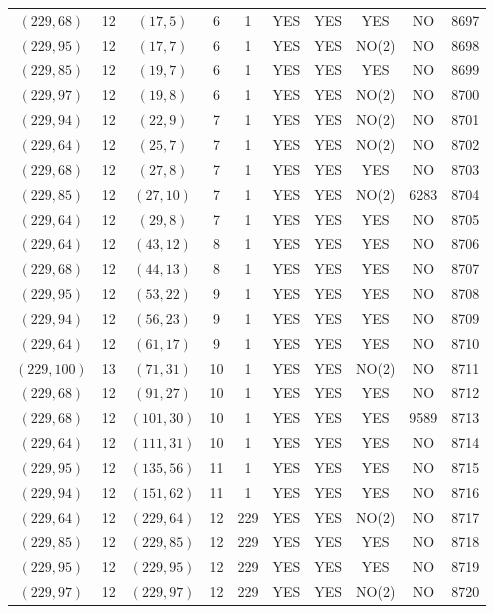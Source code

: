 \begin{longtable}{|c|c|c|c|c|c|c|c|c|c|}
$(229, 68)$ & 12 & $(17, 5)$ & 6 & 1 & YES & YES & YES & NO & 8697\\
$(229, 95)$ & 12 & $(17, 7)$ & 6 & 1 & YES & YES & NO(2) & NO & 8698\\
$(229, 85)$ & 12 & $(19, 7)$ & 6 & 1 & YES & YES & YES & NO & 8699\\
$(229, 97)$ & 12 & $(19, 8)$ & 6 & 1 & YES & YES & NO(2) & NO & 8700\\
$(229, 94)$ & 12 & $(22, 9)$ & 7 & 1 & YES & YES & NO(2) & NO & 8701\\
$(229, 64)$ & 12 & $(25, 7)$ & 7 & 1 & YES & YES & NO(2) & NO & 8702\\
$(229, 68)$ & 12 & $(27, 8)$ & 7 & 1 & YES & YES & YES & NO & 8703\\
$(229, 85)$ & 12 & $(27, 10)$ & 7 & 1 & YES & YES & NO(2) & 6283 & 8704\\
$(229, 64)$ & 12 & $(29, 8)$ & 7 & 1 & YES & YES & YES & NO & 8705\\
$(229, 64)$ & 12 & $(43, 12)$ & 8 & 1 & YES & YES & YES & NO & 8706\\
$(229, 68)$ & 12 & $(44, 13)$ & 8 & 1 & YES & YES & YES & NO & 8707\\
$(229, 95)$ & 12 & $(53, 22)$ & 9 & 1 & YES & YES & YES & NO & 8708\\
$(229, 94)$ & 12 & $(56, 23)$ & 9 & 1 & YES & YES & YES & NO & 8709\\
$(229, 64)$ & 12 & $(61, 17)$ & 9 & 1 & YES & YES & YES & NO & 8710\\
$(229, 100)$ & 13 & $(71, 31)$ & 10 & 1 & YES & YES & NO(2) & NO & 8711\\
$(229, 68)$ & 12 & $(91, 27)$ & 10 & 1 & YES & YES & YES & NO & 8712\\
$(229, 68)$ & 12 & $(101, 30)$ & 10 & 1 & YES & YES & YES & 9589 & 8713\\
$(229, 64)$ & 12 & $(111, 31)$ & 10 & 1 & YES & YES & YES & NO & 8714\\
$(229, 95)$ & 12 & $(135, 56)$ & 11 & 1 & YES & YES & YES & NO & 8715\\
$(229, 94)$ & 12 & $(151, 62)$ & 11 & 1 & YES & YES & YES & NO & 8716\\
$(229, 64)$ & 12 & $(229, 64)$ & 12 & 229 & YES & YES & NO(2) & NO & 8717\\
$(229, 85)$ & 12 & $(229, 85)$ & 12 & 229 & YES & YES & YES & NO & 8718\\
$(229, 95)$ & 12 & $(229, 95)$ & 12 & 229 & YES & YES & YES & NO & 8719\\
$(229, 97)$ & 12 & $(229, 97)$ & 12 & 229 & YES & YES & NO(2) & NO & 8720\\

\end{longtable}
